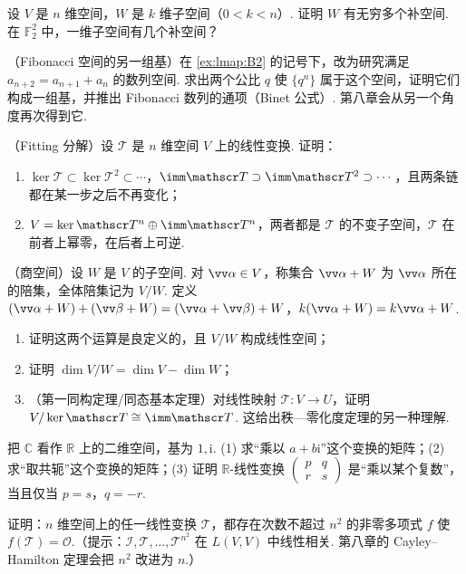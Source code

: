 {\begin{exC}
			\item\label{ex:lmap:C8} 设 $V$ 是 $n$ 维空间，$W$ 是 $k$ 维子空间（$0<k<n$）. 证明 $W$ 有无穷多个补空间. 在 $\mathbb{F}_2^2$ 中，一维子空间有几个补空间？
			\item\label{ex:lmap:C9} （Fibonacci 空间的另一组基）在 \ref{ex:lmap:B2} 的记号下，改为研究满足 $a_{n+2}=a_{n+1}+a_n$ 的数列空间. 求出两个公比 $q$ 使 $\{q^n\}$ 属于这个空间，证明它们构成一组基，并推出 Fibonacci 数列的通项（Binet 公式）. 第八章会从另一个角度再次得到它.
			\item\label{ex:lmap:C10} （Fitting 分解）设 $\mathscr T$ 是 $n$ 维空间 $V$ 上的线性变换. 证明：
			\begin{enumerate}
				\item $\ker\mathscr T\subset\ker\mathscr T^2\subset\cdots$，$\imm\mathscr T\supset\imm\mathscr T^2\supset\cdots$，且两条链都在某一步之后不再变化；
				\item $V=\ker\mathscr T^n\oplus\imm\mathscr T^n$，两者都是 $\mathscr T$ 的不变子空间，$\mathscr T$ 在前者上幂零，在后者上可逆.
			\end{enumerate}
			\item\label{ex:lmap:C11} （商空间）设 $W$ 是 $V$ 的子空间. 对 $\vv\alpha\in V$，称集合 $\vv\alpha+W$ 为 $\vv\alpha$ 所在的陪集，全体陪集记为 $V/W$. 定义 $(\vv\alpha+W)+(\vv\beta+W)=(\vv\alpha+\vv\beta)+W$，$k(\vv\alpha+W)=k\vv\alpha+W$.
			\begin{enumerate}
				\item 证明这两个运算是良定义的，且 $V/W$ 构成线性空间；
				\item 证明 $\dim V/W=\dim V-\dim W$；
				\item （第一同构定理/同态基本定理）对线性映射 $\mathscr T:V\to U$，证明 $V/\ker\mathscr T\cong\imm\mathscr T$. 这给出秩—零化度定理的另一种理解.
			\end{enumerate}
			\item\label{ex:lmap:C12} 把 $\mathbb{C}$ 看作 $\mathbb{R}$ 上的二维空间，基为 $1,\mathrm i$. (1) 求“乘以 $a+b\mathrm i$”这个变换的矩阵；(2) 求“取共轭”这个变换的矩阵；(3) 证明 $\mathbb{R}$-线性变换 $\begin{pmatrix}p&q\\r&s\end{pmatrix}$ 是“乘以某个复数”，当且仅当 $p=s$，$q=-r$.
			\item\label{ex:lmap:C13} 证明：$n$ 维空间上的任一线性变换 $\mathscr T$，都存在次数不超过 $n^2$ 的非零多项式 $f$ 使 $f(\mathscr T)=\mathscr O$.（提示：$\mathscr I,\mathscr T,\ldots,\mathscr T^{n^2}$ 在 $L(V,V)$ 中线性相关. 第八章的 Cayley–Hamilton 定理会把 $n^2$ 改进为 $n$.）

\end{exC}}
